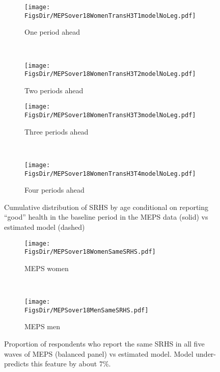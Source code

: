 \documentclass[12pt,pdftex,letterpaper]{article}
\newcommand{\RootDir}{..}
\newcommand{\FigsDir}{\RootDir/Figures}
\begin{document}
\begin{figure}[H]
	\centering
	\begin{subfigure}[b]{0.45\textwidth}
		\texttt{[image: \\FigsDir/MEPSover18WomenTransH3T1modelNoLeg.pdf]}
		\caption{One period ahead}\label{fig:Model1Ahead}
	\end{subfigure}
	~
	\begin{subfigure}[b]{0.45\textwidth}
		\texttt{[image: \\FigsDir/MEPSover18WomenTransH3T2modelNoLeg.pdf]}
		\caption{Two periods ahead}\label{fig:Model2Ahead}
	\end{subfigure}
	
	\begin{subfigure}[b]{0.45\textwidth}
		\texttt{[image: \\FigsDir/MEPSover18WomenTransH3T3modelNoLeg.pdf]}
		\caption{Three periods ahead}\label{fig:Model3Ahead}
	\end{subfigure}
	~
	\begin{subfigure}[b]{0.45\textwidth}
		\texttt{[image: \\FigsDir/MEPSover18WomenTransH3T4modelNoLeg.pdf]}
		\caption{Four periods ahead}\label{fig:Model4AheadGood}
	\end{subfigure}
	\caption{Cumulative distribution of SRHS by age conditional on reporting ``good'' health in the baseline period in the MEPS data (solid) vs estimated model (dashed)}\label{fig:ModelTransMEPSgood}
\end{figure}

\begin{figure}[H]
	\centering
	\begin{subfigure}[b]{0.48\textwidth}
		\texttt{[image: \\FigsDir/MEPSover18WomenSameSRHS.pdf]}
		\caption{MEPS women}
	\end{subfigure}
	~
	\begin{subfigure}[b]{0.48\textwidth}
		\texttt{[image: \\FigsDir/MEPSover18MenSameSRHS.pdf]}
		\caption{MEPS men}
	\end{subfigure}
	\caption{Proportion of respondents who report the same SRHS in all five waves of MEPS (balanced panel) vs estimated model.  Model under-predicts this feature by about 7\%.}\label{fig:MEPSsameSRHS}
\end{figure}

\newpage
\end{document}
